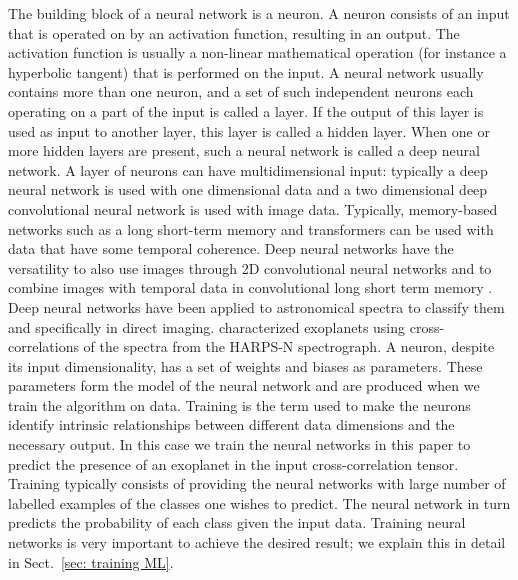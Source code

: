 \documentclass[referee]{aa} %
\begin{document}
The building block of a neural network is a neuron.
A neuron consists of an input that is operated on by an activation function, resulting in an output.
The activation function is usually a non-linear mathematical operation (for instance a hyperbolic tangent) that is performed on the input.
A neural network usually contains more than one neuron, and a set of such independent neurons each operating on a part of the input is called a layer. 
If the output of this layer is used as input to another layer, this layer is called a hidden layer.
When one or more hidden layers are present, such a neural network is called a deep neural network.
A layer of neurons can have multidimensional input: typically a deep neural network is used with one dimensional data and a two dimensional deep convolutional neural network is used with image data.
Typically, memory-based networks such as a long short-term memory and transformers can be used with data that have some temporal coherence.
Deep neural networks have the versatility to also use images through 2D convolutional neural networks \citep[CNN,][]{shi2015convolutional} and to combine images with temporal data in convolutional long short term memory \citep[convLSTM,][]{1997HocherieterLSTM,2022convLSTM}.
Deep neural networks have been applied to astronomical spectra \citep[e.g.,][]{2019Leung,2020Tao} to classify them and specifically in direct imaging.
\citet{2020Fisher} characterized exoplanets using cross-correlations of the spectra from the HARPS-N spectrograph. A neuron, despite its input dimensionality, has a set of weights and biases as parameters. 
These parameters form the model of the neural network and are produced when we train the algorithm on data.
Training is the term used to make the neurons identify intrinsic relationships between different data dimensions and the necessary output.
In this case we train the neural networks in this paper to predict the presence of an exoplanet in the input cross-correlation tensor.
Training typically consists of providing the neural networks with large number of labelled examples of the classes one wishes to predict.
The neural network in turn predicts the probability of each class given the input data.
Training neural networks is very important to achieve the desired result; we explain this in detail in Sect.~\ref{sec: training ML}.
\end{document}
